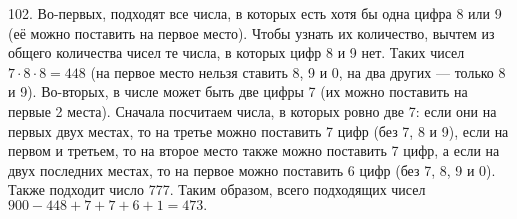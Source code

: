 102. Во-первых, подходят все числа, в которых есть хотя бы одна цифра 8 или 9 (её можно поставить на первое место). Чтобы узнать их количество, вычтем из общего количества чисел те числа, в которых цифр 8 и 9 нет. Таких чисел $7\cdot8\cdot8=448$ (на первое место нельзя ставить 8, 9 и 0, на два других --- только 8 и 9). Во-вторых, в числе может быть две цифры 7 (их можно поставить на первые 2 места). Сначала посчитаем числа, в которых ровно две 7: если они на первых двух местах, то на третье можно поставить 7 цифр (без 7, 8 и 9), если на первом и третьем, то на второе место также можно поставить 7 цифр, а если на двух последних местах, то на первое можно поставить 6 цифр (без 7, 8, 9 и 0). Также подходит число 777.
Таким образом, всего подходящих чисел $900-448+7+7+6+1=473.$
\newpage
